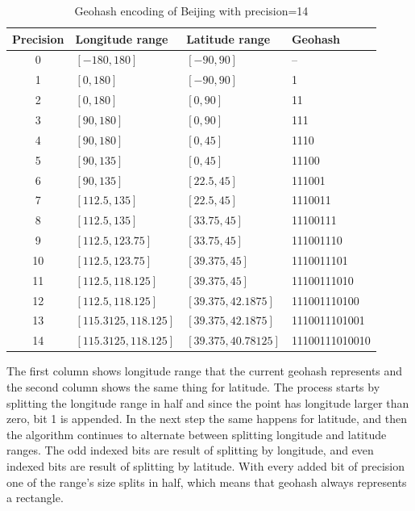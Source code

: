 \documentclass[times, utf8, diplomski]{fer}
\begin{document}
\begin{table}[h]
\caption{Geohash encoding of Beijing with precision=14}
\begin{center}
\begin{tabular}{ |c|l|l|l| } 
	\hline
	Precision & Longitude range & Latitude range & Geohash \\
	\hline
	0 & $[-180, 180]$ & $[-90, 90]$ & -- \\ 
	1 & $[0, 180]$ & $[-90, 90]$ & 1 \\ 
	2 & $[0, 180]$ & $[0, 90]$ & 11 \\ 
	3 & $[90, 180]$ & $[0, 90]$ & 111 \\ 
	4 & $[90, 180]$ & $[0, 45]$ & 1110 \\ 
	5 & $[90, 135]$ & $[0, 45]$ & 11100 \\ 
	6 & $[90, 135]$ & $[22.5, 45]$ & 111001 \\ 
	7 & $[112.5, 135]$ & $[22.5, 45]$ & 1110011 \\ 
	8 & $[112.5, 135]$ & $[33.75, 45]$ & 11100111 \\ 
	9 & $[112.5, 123.75]$ & $[33.75, 45]$ & 111001110 \\ 
	10 & $[112.5, 123.75]$ & $[39.375, 45]$ & 1110011101 \\ 
	11 & $[112.5, 118.125]$ & $[39.375, 45]$ & 11100111010 \\ 
	12 & $[112.5, 118.125]$ & $[39.375, 42.1875]$ & 111001110100 \\ 
	13 & $[115.3125, 118.125]$ & $[39.375, 42.1875]$ & 1110011101001 \\ 
	14 & $[115.3125, 118.125]$ & $[39.375, 40.78125]$ & 11100111010010 \\ 
	\hline
\end{tabular}
\end{center}
\label{table:1}
\end{table}

The first column shows longitude range that the current geohash represents and the second column shows the same thing for latitude. The process starts by splitting the longitude range in half and since the point has longitude larger than zero, bit 1 is appended. In the next step the same happens for latitude, and then the algorithm continues to alternate between splitting longitude and latitude ranges. The odd indexed bits are result of splitting by longitude, and even indexed bits are result of splitting by latitude. With every added bit of precision one of the range's size splits in half, which means that geohash always represents a rectangle.
\end{document}
